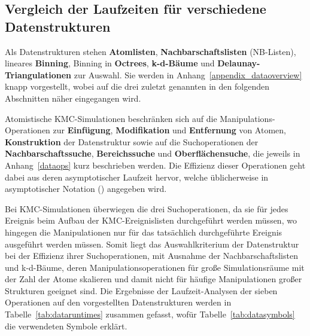 \subsection{Vergleich der Laufzeiten für verschiedene Datenstrukturen}

Als Datenstrukturen stehen \textbf{Atomlisten}, \textbf{Nachbarschaftslisten} (NB-Listen), lineares \textbf{Binning}, Binning in \textbf{Octrees}, \textbf{k-d-Bäume} und \textbf{Delaunay-Triangulationen} zur Auswahl\cite{skiena_algorithm_2010,press_numerical_2007}.
Sie werden in Anhang~\ref{appendix_dataoverview} knapp vorgestellt, wobei auf die drei zuletzt genannten in den folgenden Abschnitten näher eingegangen wird.

Atomistische KMC-Simulationen beschränken sich auf die Manipulations-Operationen zur \textbf{Einfügung}, \textbf{Modifikation} und \textbf{Entfernung} von Atomen, \textbf{Konstruktion} der Datenstruktur sowie auf die Suchoperationen der \textbf{Nachbarschaftssuche}, \textbf{Bereichssuche} und \textbf{Oberflächensuche}, die jeweils in Anhang~\ref{dataops} kurz beschrieben werden.
Die Effizienz dieser Operationen geht dabei aus deren asymptotischer Laufzeit hervor, welche üblicherweise in asymptotischer Notation (\BigO{}) angegeben wird.

Bei KMC-Simulationen überwiegen die drei Suchoperationen, da sie für jedes Ereignis beim Aufbau der KMC-Ereignislisten durchgeführt werden müssen, wo hingegen die Manipulationen nur für das tatsächlich durchgeführte Ereignis ausgeführt werden müssen.
Somit liegt das Auswahlkriterium der Datenstruktur bei der Effizienz ihrer Suchoperationen, mit Ausnahme der Nachbarschaftslisten und k-d-Bäume, deren Manipulationsoperationen für große Simulationsräume mit der Zahl der Atome skalieren und damit nicht für häufige Manipulationen großer Strukturen geeignet sind.
Die Ergebnisse der Laufzeit-Analysen der sieben Operationen auf den vorgestellten Datenstrukturen werden in Tabelle~\ref{tab:dataruntimes} zusammen gefasst, wofür Tabelle~\ref{tab:datasymbols} die verwendeten Symbole erklärt.


